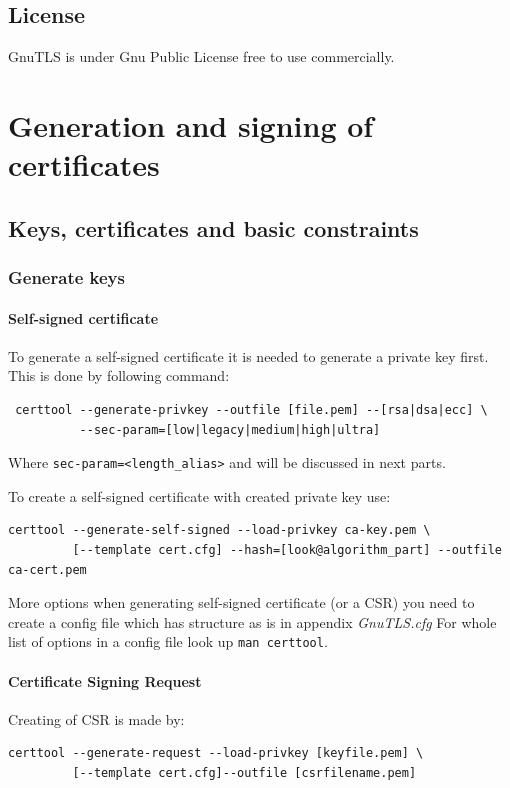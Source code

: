 \documentclass[10pt, a4paper]{report}
\begin{document}
  \subsection{License}
GnuTLS is under Gnu Public License \- free to use commercially.
  
\section{Generation and signing of certificates}

  \subsection{Keys, certificates and basic constraints}
  
    \subsubsection{Generate keys}
    
      \paragraph{Self-signed certificate}
To generate a self-signed certificate it is needed to generate a private key first. This is done by following command:
\begin{verbatim}
 certtool --generate-privkey --outfile [file.pem] --[rsa|dsa|ecc] \
          --sec-param=[low|legacy|medium|high|ultra]
\end{verbatim}
Where \verb+sec-param=<length_alias>+ and will be discussed in next parts.

To create a self-signed certificate with created private key use:
\begin{verbatim}
certtool --generate-self-signed --load-privkey ca-key.pem \
         [--template cert.cfg] --hash=[look@algorithm_part] --outfile ca-cert.pem
\end{verbatim}

More options when generating self-signed certificate (or a CSR) you need to create a config file which has structure as is in appendix \textit{GnuTLS.cfg} 
For whole list of options in a config file look up \verb+man certtool+.
      
\paragraph{Certificate Signing Request}
Creating of CSR is made by:
\begin{verbatim}
certtool --generate-request --load-privkey [keyfile.pem] \
         [--template cert.cfg]--outfile [csrfilename.pem]
\end{verbatim}
\end{document}
